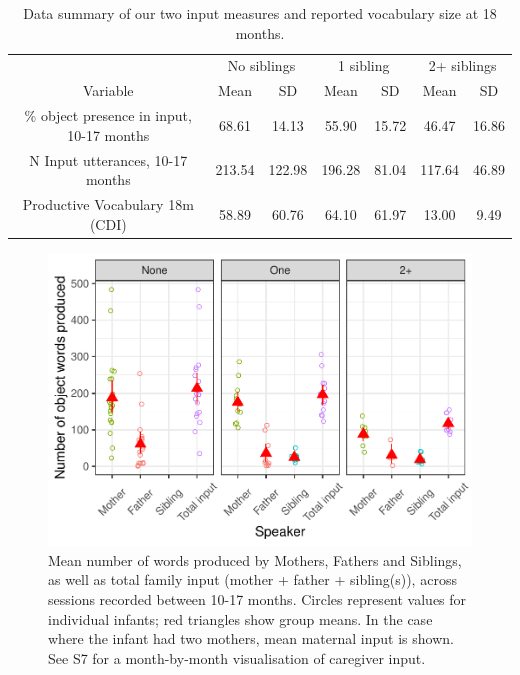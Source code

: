 \documentclass[
  man,mask,floatsintext]{apa6}
\begin{document}
\begin{table}[!h]

\caption{\label{tab:table-data-summary}Data summary of our two input measures and reported vocabulary size at 18 months.}
\centering
\begin{tabular}[t]{ccccccc}
\toprule
\multicolumn{1}{c}{ } & \multicolumn{2}{c}{No siblings} & \multicolumn{2}{c}{1 sibling} & \multicolumn{2}{c}{2+ siblings} \\
\cmidrule(l{3pt}r{3pt}){2-3} \cmidrule(l{3pt}r{3pt}){4-5} \cmidrule(l{3pt}r{3pt}){6-7}
\multicolumn{1}{c}{Variable} & \multicolumn{1}{c}{Mean} & \multicolumn{1}{c}{SD} & \multicolumn{1}{c}{Mean} & \multicolumn{1}{c}{SD} & \multicolumn{1}{c}{Mean} & \multicolumn{1}{c}{SD} \\
\cmidrule(l{3pt}r{3pt}){1-1} \cmidrule(l{3pt}r{3pt}){2-2} \cmidrule(l{3pt}r{3pt}){3-3} \cmidrule(l{3pt}r{3pt}){4-4} \cmidrule(l{3pt}r{3pt}){5-5} \cmidrule(l{3pt}r{3pt}){6-6} \cmidrule(l{3pt}r{3pt}){7-7}
\% object presence in input, 10-17 months & 68.61 & 14.13 & 55.90 & 15.72 & 46.47 & 16.86\\
N Input utterances, 10-17 months & 213.54 & 122.98 & 196.28 & 81.04 & 117.64 & 46.89\\
Productive Vocabulary 18m (CDI) & 58.89 & 60.76 & 64.10 & 61.97 & 13.00 & 9.49\\
\bottomrule
\end{tabular}
\end{table}

\begin{figure}
\centering
\includegraphics{SiblingsStudyText-anon-revisions_files/figure-latex/Figure-Speaker-count-1.pdf}
\caption{\label{fig:Figure-Speaker-count}Mean number of words produced by Mothers, Fathers and Siblings, as well as total family input (mother + father + sibling(s)), across sessions recorded between 10-17 months. Circles represent values for individual infants; red triangles show group means. In the case where the infant had two mothers, mean maternal input is shown. See S7 for a month-by-month visualisation of caregiver input.}
\end{figure}
\end{document}
